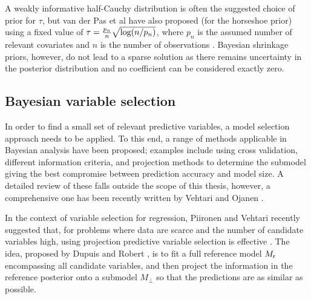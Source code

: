A weakly
informative half-Cauchy distribution is often the suggested choice of prior
for $\tau$, but van der Pas et al have also proposed (for the horseshoe prior)
using a fixed value of $\tau = \frac{p_n}{n}\sqrt{\textup{log}(n/p_n)}$,
where $p_n$ is the assumed number of relevant covariates and $n$ is the number
of observations \citep{vanderpas2014}. Bayesian shrinkage priors, however, do
not lead to a sparse solution as there remains uncertainty in the posterior
distribution and no coefficient can be considered exactly zero.




\subsection{Bayesian variable selection}\label{sec:bayes-variable-selection}

In order to find a small set of relevant predictive variables, a model
selection approach needs to be applied. To this end, a range of methods
applicable in Bayesian analysis have been proposed; examples include using
cross validation, different information criteria, and projection
methods to determine the submodel giving the best compromise between
prediction accuracy and model size. A detailed review of these falls outside
the scope of this thesis, however, a comprehensive one has been recently
written by Vehtari and Ojanen \citep{Vehtari2012}.

In the context of variable selection for regression,
Piironen and Vehtari recently suggested that, for problems where data
are scarce and the number of candidate variables high, using projection predictive
variable selection is effective \citep{Piironen2016}. The idea, proposed by
Dupuis and Robert \citep{Dupuis2003}, is to fit a full reference model $M_{\textup{r}}$
encompassing all candidate variables,
and then project the information in the reference posterior onto a submodel $M_\perp$
so that the predictions are as similar as possible.

